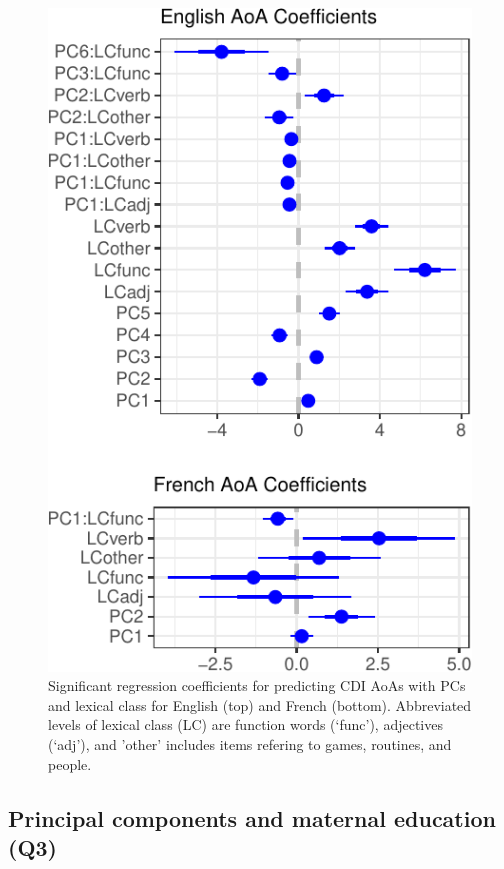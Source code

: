 \documentclass[10pt, letterpaper]{article}
\newenvironment{CodeChunk}{}{}
\begin{document}
\begin{CodeChunk}
\begin{figure}[H]

{\centering \includegraphics{figs/unnamed-chunk-9-1} 

}

\caption[Significant regression coefficients for predicting CDI AoAs with PCs and lexical class for English (top) and French (bottom)]{Significant regression coefficients for predicting CDI AoAs with PCs and lexical class for English (top) and French (bottom). Abbreviated levels of lexical class (LC) are function words (`func'), adjectives (`adj'), and 'other' includes items refering to games, routines, and people.}\label{fig:unnamed-chunk-9}
\end{figure}
\end{CodeChunk}

\hypertarget{principal-components-and-maternal-education-q3}{%
\subsection{Principal components and maternal education
(Q3)}\label{principal-components-and-maternal-education-q3}}
\end{document}
